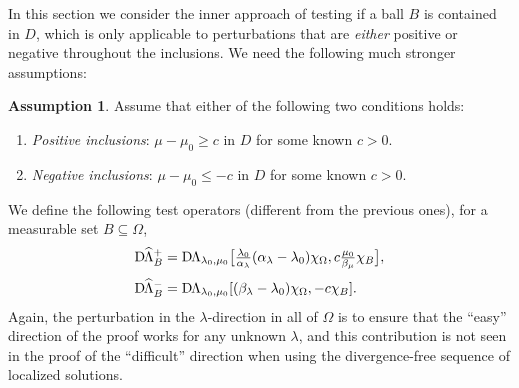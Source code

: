 \documentclass[reqno]{amsart}
\numberwithin{equation}{section}
\numberwithin{figure}{section}
\numberwithin{table}{section}
\newcommand{\DLambda}{\textup{D}\mkern-1.5mu \Lambda}
\newcommand{\DhLambda}{\textup{D}\mkern-1.5mu \widehat{\Lambda}}
\theoremstyle{definition}
\theoremstyle{plain}
\theoremstyle{definition}
\newtheorem{assumption}[thm]{Assumption}
\theoremstyle{remark}
\numberwithin{equation}{section}
\begin{document}
In this section we consider the inner approach of testing if a ball $B$ is contained in $D$, which is only applicable to perturbations that are \emph{either} positive or negative throughout the inclusions. We need the following much stronger assumptions:
%
\begin{assumption} \label{assump:inner}
	Assume that either of the following two conditions holds:
	\begin{enumerate}[\rm(a)]
		\item \emph{Positive inclusions}: $\mu-\mu_0\geq c$ in $D$ for some known $c>0$.
		\item \emph{Negative inclusions}: $\mu-\mu_0\leq -c$ in $D$ for some known $c>0$.
	\end{enumerate}
\end{assumption}
%
We define the following test operators (different from the previous ones), for a measurable set $B\subseteq\Omega$,
%
\begin{align*}
\DhLambda_B^+ &= \DLambda_{\lambda_0,\mu_0}\big[\tfrac{\lambda_0}{\alpha_\lambda}(\alpha_\lambda-\lambda_0)\chi_\Omega,c\tfrac{\mu_0}{\beta_\mu}\chi_B \big], \\[1mm]
\DhLambda_B^- &= \DLambda_{\lambda_0,\mu_0}[(\beta_\lambda-\lambda_0)\chi_\Omega,-c\chi_B].
\end{align*}
%
Again, the perturbation in the $\lambda$-direction in all of $\Omega$ is to ensure that the ``easy'' direction of the proof works for any unknown $\lambda$, and this contribution is not seen in the proof of the ``difficult'' direction when using the divergence-free sequence of localized solutions.
\end{document}
